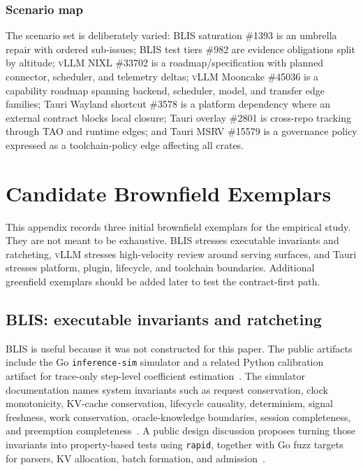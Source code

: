 \documentclass[sigconf,review,anonymous]{acmart}
\theoremstyle{plain}
\theoremstyle{definition}
\begin{document}
\subsubsection{Scenario map}

The scenario set is deliberately varied: BLIS saturation \#1393 is an umbrella
repair with ordered sub-issues; BLIS test tiers \#982 are evidence obligations
split by altitude; \textsc{vLLM} NIXL \#33702 is a roadmap/specification with
planned connector, scheduler, and telemetry deltas; \textsc{vLLM} Mooncake
\#45036 is a capability roadmap spanning backend, scheduler, model, and transfer
edge families; Tauri Wayland shortcut \#3578 is a platform dependency where an
external contract blocks local closure; Tauri overlay \#2801 is cross-repo
tracking through TAO and runtime edges; and Tauri MSRV \#15579 is a governance
policy expressed as a toolchain-policy edge affecting all crates.

\section{Candidate Brownfield Exemplars}\label{app:exemplars}

This appendix records three initial brownfield exemplars for the empirical
study. They are not meant to be exhaustive. BLIS stresses executable invariants
and ratcheting, \textsc{vLLM} stresses high-velocity review around serving
surfaces, and Tauri stresses platform, plugin, lifecycle, and toolchain
boundaries. Additional greenfield exemplars should be added later to test the
contract-first path.

\subsection{BLIS: executable invariants and ratcheting}
\label{app:blis}

BLIS is useful because it was not constructed for this paper. The public
artifacts include the Go \texttt{inference-sim} simulator and a related Python
calibration artifact for trace-only step-level coefficient
estimation~\cite{inferencesim,blisrepo}. The
simulator documentation names system invariants such as request conservation,
clock monotonicity, KV-cache conservation, lifecycle causality, determinism,
signal freshness, work conservation, oracle-knowledge boundaries, session
completeness, and preemption completeness~\cite{blisinvariants}. A public design
discussion proposes turning those invariants into property-based tests using
\texttt{rapid}, together with Go fuzz targets for parsers, KV allocation, batch
formation, and admission~\cite{blispropertydiscussion}.
\end{document}
